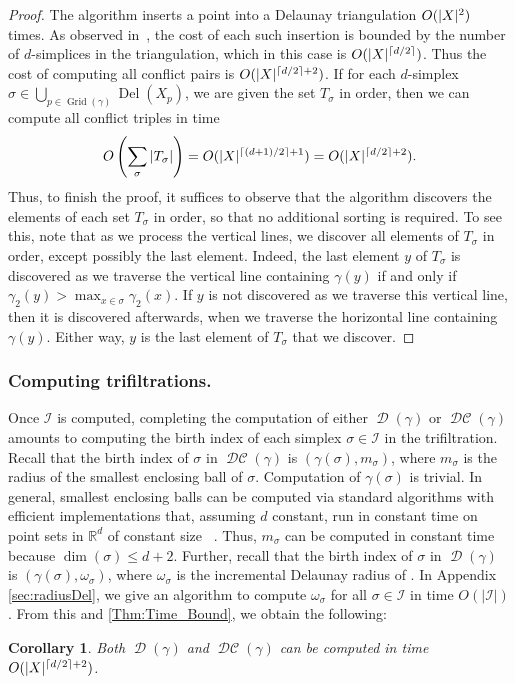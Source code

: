 \documentclass[11pt]{amsart}
\DeclarePairedDelimiter\ceil{\lceil}{\rceil}
\DeclarePairedDelimiter\abs{\lvert}{\rvert}
\newcommand{\R}{\mathbb{R}} %
\DeclareMathOperator{\DelT}{Del}
\DeclareMathOperator{\Del}{\mathcal{D}}
\DeclareMathOperator{\DelCech}{\mathcal{DC}}
\DeclareMathOperator{\Grid}{\mathrm{Grid}}
\newcommand{\Incr}[0]{\mathcal{I}}
\renewcommand{\subparagraph}[1]{\subsubsection*{\textbf{\textup{#1}}}}
\theoremstyle{plain}
\newtheorem{corollary}[theorem]{Corollary}
\theoremstyle{definition}
\theoremstyle{remark}
\newcommand{\SizeBound}{{\lceil (d+1)/2 \rceil + 1}}
\newcommand{\CompBound}{{\lceil d/2\rceil +2}}
\begin{document}
\begin{proof}
The algorithm inserts a point into a Delaunay triangulation $O(\abs{X}^{2})$ times.  As observed in~\cite[Section 2]{alonsoDelaunayBifiltrationsFunctions2024},  the cost of each such insertion is bounded by the number of $d$-simplices in the triangulation, which in this case is $O(\abs{X}^{\ceil{d/2}})$.  Thus the cost of computing all conflict pairs is $O(\abs{X}^\CompBound)$.  
%
If for each $d$-simplex $\sigma\in \bigcup_{p\in \Grid(\gamma)} \DelT(X_p)$, we are given the set $T_{\sigma}$ in order, then we can compute all conflict triples in time \[O\left(\sum_{\sigma} |T_{\sigma}|\right)=O(\abs{X}^{\SizeBound})=O(\abs{X}^\CompBound).\]  Thus, to finish the proof, it suffices to observe that the algorithm discovers the elements of each set $T_{\sigma}$ in order, so that no additional sorting is required.  To see this, note that as we process the vertical lines, we discover all elements of $T_{\sigma}$ in order,  except possibly the last element.  Indeed, the last element $y$ of $T_{\sigma}$ is discovered as we traverse the vertical line containing $\gamma(y)$ if and only if $\gamma_2(y)> \max_{x\in \sigma} \gamma_2(x)$.  If $y$ is not discovered as we traverse this vertical line, then it is discovered afterwards, when we traverse the horizontal line containing $\gamma(y)$.  Either way, $y$ is the last element of $T_{\sigma}$ that we discover.
\end{proof}
%
%
%
\subparagraph{Computing trifiltrations.} 
Once $\Incr$ is computed, completing the computation of either $\Del(\gamma)$ or
$\DelCech(\gamma)$ amounts to computing the birth index of each simplex $\sigma\in\Incr$ in the trifiltration.
Recall that the birth index of $\sigma$ in $\DelCech(\gamma)$ is $(\gamma(\sigma), m_\sigma)$, where $m_\sigma$ is the radius of the smallest enclosing ball of $\sigma$.  Computation of $\gamma(\sigma)$  is trivial.  In general, smallest enclosing balls can be computed via standard algorithms with efficient implementations that, assuming  $d$ constant, run in constant time on point sets in $\R^d$ of constant size~\cite{welzlSmallestEnclosingDisks1991,fischerFastSmallestEnclosingBallComputation2003,fischerSmallestEnclosingBall2004,gartnerFastRobustSmallest1999,cgal:fghhs-bv-24a} .  Thus, $m_\sigma$ can be computed in constant time because $\dim(\sigma)\leq d+2$.  Further, recall that the birth index of $\sigma$ in $\Del(\gamma)$ is $(\gamma(\sigma), \omega_\sigma)$, where $\omega_\sigma$ is the incremental Delaunay radius of .  In Appendix \ref{sec:radiusDel}, we give an algorithm to compute $\omega_\sigma$  for all $\sigma\in\Incr$ in time $O(|\Incr|)$.  From this and \cref{Thm:Time_Bound}, we obtain the following:
%
\begin{corollary}\label{Thm:Filtration_Time_Bound}
Both  $\Del(\gamma)$ and $\DelCech(\gamma)$ can be computed in time $O(\abs{X}^{\ceil{d/2}+2})$.
\end{corollary}
%
%
\end{document}
